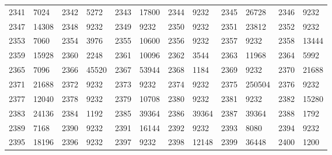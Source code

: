 \begin{longtable}{llllllllllll}
2341 & 7024&2342 &5272&2343& 17800&2344 &9232&2345 &26728&2346& 9232\\
2347 & 14308&2348 &9232&2349& 9232&2350 &9232&2351 &23812&2352& 9232\\
2353 & 7060&2354 &3976&2355& 10600&2356 &9232&2357 &9232&2358& 13444\\
2359 & 15928&2360 &2248&2361& 10096&2362 &3544&2363 &11968&2364& 5992\\
2365 & 7096&2366 &45520&2367& 53944&2368 &1184&2369 &9232&2370& 21688\\
2371 & 21688&2372 &9232&2373& 9232&2374 &9232&2375 &250504&2376& 9232\\
2377 & 12040&2378 &9232&2379& 10708&2380 &9232&2381 &9232&2382& 15280\\
2383 & 24136&2384 &1192&2385& 39364&2386 &39364&2387 &39364&2388& 1792\\
2389 & 7168&2390 &9232&2391& 16144&2392 &9232&2393 &8080&2394& 9232\\
2395 & 18196&2396 &9232&2397& 9232&2398 &12148&2399 &36448&2400& 1200\\
\bottomrule\end{longtable}
